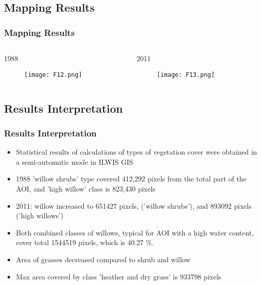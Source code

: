 \documentclass[pdflatex,compress,9pt,
	xcolor={dvipsnames,dvipsnames,svgnames,x11names,table},
	hyperref={colorlinks = true,breaklinks = true, urlcolor = NavyBlue, breaklinks = true}]{beamer}
\begin{document}
\subsection{Mapping Results}
\begin{frame}\frametitle{Mapping Results}
\begin{minipage}[0.4\textheight]{\textwidth}
\begin{columns}[T]
\begin{column}{0.5\textwidth}
1988
\begin{figure}[H]
	\centering
		\texttt{[image: F12.png]}
\end{figure}
\end{column}
\begin{column}{0.5\textwidth}
2011
\begin{figure}[H]
	\centering
		\texttt{[image: F13.png]}
\end{figure}
\end{column}
\end{columns}
\end{minipage}
\end{frame}

\subsection{Results Interpretation}
\begin{frame}\frametitle{Results Interpretation}
\begin{itemize}
            \item Statistical results of calculations of types of vegetation cover were obtained in a semi-automatic mode in ILWIS GIS
            \item 1988 'willow shrubs' type covered 412,292 pixels from the total part of the AOI, and 'high willow' class is 823,430 pixels
            \item 2011: willow increased to 651427 pixels, ('willow shrubs'), and 893092 pixels ('high willows')
            \item Both combined classes of willows, typical for AOI with a high water content, cover total 1544519 pixels, which is 40.27 \%. 
            \item Area of grasses decreased compared to shrub and willow
            \item Max area covered by class 'heather and dry grass' is 933798 pixels
\end{itemize}
\end{frame}
\end{document}
